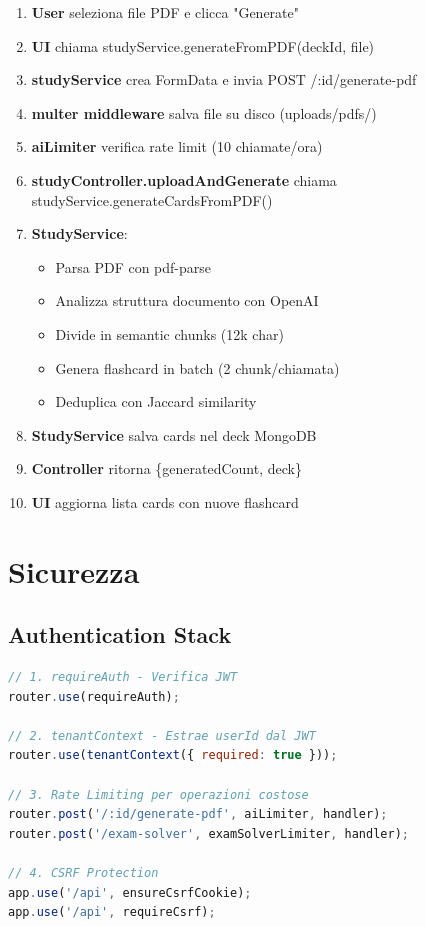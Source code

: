 \documentclass[11pt,a4paper]{article}
\begin{document}
\begin{enumerate}
    \item \textbf{User} seleziona file PDF e clicca "Generate"
    \item \textbf{UI} chiama studyService.generateFromPDF(deckId, file)
    \item \textbf{studyService} crea FormData e invia POST /:id/generate-pdf
    \item \textbf{multer middleware} salva file su disco (uploads/pdfs/)
    \item \textbf{aiLimiter} verifica rate limit (10 chiamate/ora)
    \item \textbf{studyController.uploadAndGenerate} chiama studyService.generateCardsFromPDF()
    \item \textbf{StudyService}:
    \begin{itemize}
        \item Parsa PDF con pdf-parse
        \item Analizza struttura documento con OpenAI
        \item Divide in semantic chunks (12k char)
        \item Genera flashcard in batch (2 chunk/chiamata)
        \item Deduplica con Jaccard similarity
    \end{itemize}
    \item \textbf{StudyService} salva cards nel deck MongoDB
    \item \textbf{Controller} ritorna \{generatedCount, deck\}
    \item \textbf{UI} aggiorna lista cards con nuove flashcard
\end{enumerate}

\section{Sicurezza}\label{sec:security}

\subsection{Authentication Stack}

\begin{lstlisting}[language=JavaScript]
// 1. requireAuth - Verifica JWT
router.use(requireAuth);

// 2. tenantContext - Estrae userId dal JWT
router.use(tenantContext({ required: true }));

// 3. Rate Limiting per operazioni costose
router.post('/:id/generate-pdf', aiLimiter, handler);
router.post('/exam-solver', examSolverLimiter, handler);

// 4. CSRF Protection
app.use('/api', ensureCsrfCookie);
app.use('/api', requireCsrf);
\end{lstlisting}
\end{document}
